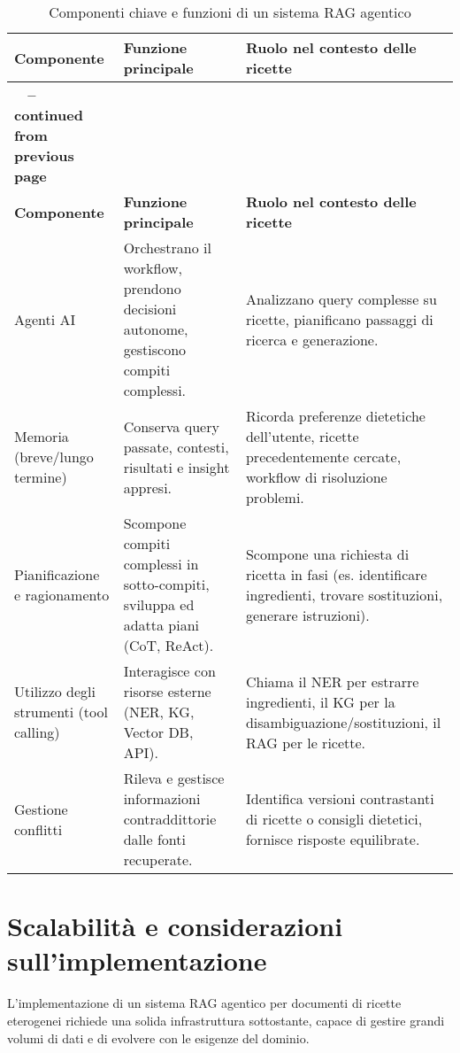 \documentclass[a4paper, 11pt]{article}
\begin{document}
\begin{longtable}{>{\raggedright\arraybackslash}p{4cm} >{\raggedright\arraybackslash}p{6cm} >{\raggedright\arraybackslash}p{6cm}}
\caption{Componenti chiave e funzioni di un sistema RAG agentico}\\
\toprule
\textbf{Componente} & \textbf{Funzione principale} & \textbf{Ruolo nel contesto delle ricette} \\
\midrule
\endfirsthead
\multicolumn{3}{c}%
{{\bfseries \tablename\ \thetable{} -- continued from previous page}} \\
\toprule
\textbf{Componente} & \textbf{Funzione principale} & \textbf{Ruolo nel contesto delle ricette} \\
\midrule
\endhead
\bottomrule
\endfoot
Agenti AI \cite{what_is_agentic_rag_ibm} & Orchestrano il workflow, prendono decisioni autonome, gestiscono compiti complessi. & Analizzano query complesse su ricette, pianificano passaggi di ricerca e generazione. \\
\addlinespace
Memoria (breve/lungo termine) \cite{what_is_agentic_rag_ibm} & Conserva query passate, contesti, risultati e insight appresi. & Ricorda preferenze dietetiche dell'utente, ricette precedentemente cercate, workflow di risoluzione problemi. \\
\addlinespace
Pianificazione e ragionamento \cite{what_is_agentic_rag_ibm} & Scompone compiti complessi in sotto-compiti, sviluppa ed adatta piani (CoT, ReAct). & Scompone una richiesta di ricetta in fasi (es. identificare ingredienti, trovare sostituzioni, generare istruzioni). \\
\addlinespace
Utilizzo degli strumenti (tool calling) \cite{what_is_agentic_rag_ibm} & Interagisce con risorse esterne (NER, KG, Vector DB, API). & Chiama il NER per estrarre ingredienti, il KG per la disambiguazione/sostituzioni, il RAG per le ricette. \\
\addlinespace
Gestione conflitti \cite{dragged_into_conflicts} & Rileva e gestisce informazioni contraddittorie dalle fonti recuperate. & Identifica versioni contrastanti di ricette o consigli dietetici, fornisce risposte equilibrate. \\
\end{longtable}

\section{Scalabilità e considerazioni sull'implementazione}
L'implementazione di un sistema RAG agentico per documenti di ricette eterogenei richiede una solida infrastruttura sottostante, capace di gestire grandi volumi di dati e di evolvere con le esigenze del dominio.
\end{document}
